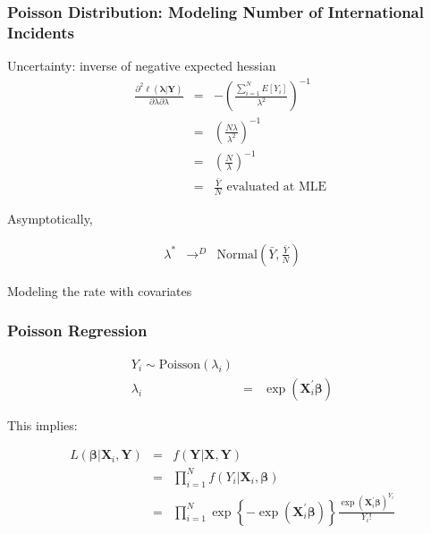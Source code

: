 \documentclass{beamer}
\begin{document}
\begin{frame}
\frametitle{Poisson Distribution: Modeling Number of International Incidents}

Uncertainty: inverse of negative expected hessian
\begin{eqnarray}
\frac{\partial^2 \ell(\boldsymbol{\lambda}| \boldsymbol{Y})}{\partial \lambda \partial \lambda }  & = & - \left(\frac{\sum_{i=1}^{N} E[Y_{i}] }{\lambda^2}\right)^{-1} \nonumber \\
& = & \left(\frac{ N \lambda  }{\lambda^2}\right)^{-1} \nonumber \\
& = & \left(\frac{N }{\lambda}\right)^{-1} \nonumber \\
& = & \frac{\bar{Y}}{N} \text{ evaluated at MLE } \nonumber
\end{eqnarray}

Asymptotically,

\begin{eqnarray}
\lambda^{*}  & \longrightarrow^{D} & \text{Normal}(\bar{Y}, \frac{\bar{Y}}{N}) \nonumber
\end{eqnarray}

\end{frame}

\begin{frame}

\huge

Modeling the rate with covariates

\end{frame}


\begin{frame}
\frametitle{Poisson Regression}
\begin{eqnarray}
Y_{i} \sim \text{Poisson}(\lambda_{i}) \nonumber \\
\lambda_{i} &  = & \exp(\boldsymbol{X}_{i}^{'} \boldsymbol{\beta}) \nonumber
\end{eqnarray}

This implies:

\begin{eqnarray}
L(\boldsymbol{\beta}| \boldsymbol{X}_{i}, \boldsymbol{Y}) & = & f(\boldsymbol{Y}| \boldsymbol{X}, \boldsymbol{Y}) \nonumber \\
& = & \prod_{i=1}^{N} f(Y_{i} | \boldsymbol{X}_{i}, \boldsymbol{\beta}) \nonumber \\
& = & \prod_{i=1}^{N} \exp\left\{ - \exp(\boldsymbol{X}_{i}^{'} \boldsymbol{\beta})\right\} \frac{\exp(\boldsymbol{X}_{i}^{'} \boldsymbol{\beta})^{Y_{i}}}{Y_{i}!} \nonumber
\end{eqnarray}



\end{frame}
\end{document}
